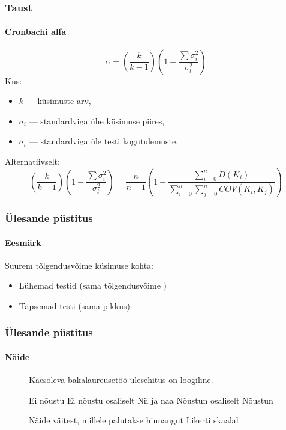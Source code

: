 \documentclass[aspectratio=149]{beamer}
\begin{document}
  \begin{frame}
  \frametitle{Taust}
  \framesubtitle{Cronbachi alfa}
  
\begin{equation*}
\alpha =(\frac{k}{k-1})( 1 - \frac{\sum \sigma_i^2}{\sigma_t^2})
\end{equation*}
  Kus:
  \begin{itemize}
  \item $k$ --- k\"usimuste arv, 
  \item $\sigma_i$ --- standardviga \"uhe k\"usimuse piires,
  \item $\sigma_t$ --- standardviga \"ule testi kogutulemuste.
  \end{itemize}
  
  Alternatiivselt:
\begin{equation*}
(\frac{k}{k-1})( 1 - \frac{\sum \sigma_i^2}{\sigma_t^2}) = \frac{n}{n-1}\left(1 - \frac
{\sum \limits_{i=0}^n D(K_i)}{\sum \limits_{i=0}^n \sum \limits_{j=0}^n COV(K_i,K_j)}\right)
\end{equation*}
   
  \end{frame}
  \begin{frame}
  \frametitle{\"Ulesande p\"ustitus}
  \framesubtitle{Eesmärk}
  Suurem tõlgendusvõime k\"usimuse kohta:
  \begin{itemize}
  \item L\"uhemad testid (sama tõlgendusvõime )
  \item Täpsemad testi (sama pikkus)
  \end{itemize}
  \end{frame}
  \begin{frame}
  \frametitle{\"Ulesande p\"ustitus}
  \framesubtitle{Näide}
  \begin{figure}[H]


		\colorbox{background_example}{\parbox{\textwidth}{

		\vspace{1mm}

		Käesoleva bakalaureusetöö \"ulesehitus on loogiline.

		\vspace{5pt}
		
		\begin{Form}
			\def\DefaultWidthofChoiceMenu{12pt}%


			\scriptsize
			\ChoiceMenu[bordercolor = gray,disabled = 						true,name=optionE,radio,radiosymbol=\ding{108}]{\mbox{}}\null Ei nõustu
			\ChoiceMenu[bordercolor = gray,disabled = true,name=optionD,radio,radiosymbol=\ding{108}]{\mbox{}}\null Ei nõustu osaliselt
			\ChoiceMenu[bordercolor = gray,disabled = true,name=optionC,radio,radiosymbol=\ding{108}]{\mbox{}}\null Nii ja naa
			\ChoiceMenu[bordercolor = gray,disabled = true, name=optionB,radio,radiosymbol=\ding{108}]{\mbox{}}\null Nõustun osaliselt
			\ChoiceMenu[bordercolor = gray,disabled = true,name=optionA,radio,radiosymbol=\ding{108}]{\mbox{}}\null Nõustun
			\normalsize


\end{Form}}}
\caption{Näide väitest, millele palutakse hinnangut Likerti skaalal}
\label{likert_question}
	\end{figure}

  
  \end{frame}
\end{document}
